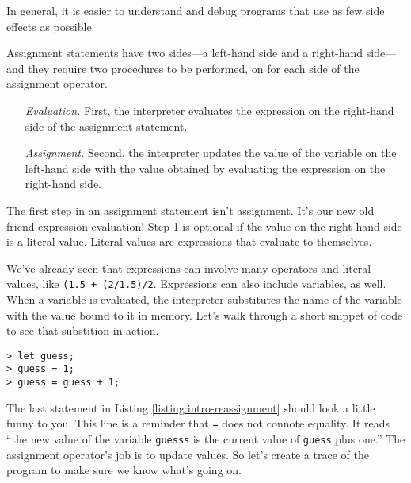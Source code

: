 \begin{center}
In general, it is easier to
understand and debug programs that use as few side effects as possible.
\end{center}

Assignment statements have two sides---a left-hand side and a right-hand
side---and they require two procedures to be performed, on for each side of the
assignment operator.

\begin{itemize}
\item[\textit{Evaluation.}] First, the interpreter evaluates the expression on
the right-hand side of the assignment statement.
\item[\textit{Assignment.}] Second, the interpreter updates the value of the
variable on the left-hand side with the value obtained by evaluating the
expression on the right-hand side.
\end{itemize}

The first step in an assignment statement isn't assignment. It's our new old
friend expression evaluation! Step 1 is optional if the value on the right-hand
side is a literal value. Literal values are expressions that evaluate to
themselves.

We've already seen that expressions can involve many operators and literal
values, like \texttt{(1.5 + (2/1.5)/2}. Expressions can also include variables,
as well. When a variable is evaluated, the interpreter substitutes the name of
the variable with the value bound to it in memory. Let's walk through a short
snippet of code to see that substition in action.

\begin{lstlisting}[caption={\label{listing:intro-reassignment} Proof that
assignment is not equality. The updating would be clearer if we had that arrow!
\texttt{guess} $\gets$ \texttt{guess + 1;}}]
> let guess;
> guess = 1;
> guess = guess + 1;
\end{lstlisting}

The last statement in Listing \ref{listing:intro-reassignment} should look a
little funny to you. This line is a reminder that \texttt{=} does not connote
equality. It reads ``the new value of the variable \texttt{guesss} is the
current value of \texttt{guess} plus one.'' The assignment operator's job is to
update values. So let's create a trace of the program to make sure we know
what's going on.

